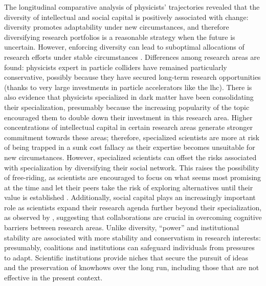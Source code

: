 \documentclass{article}
\begin{document}
The longitudinal comparative analysis of physicists' trajectories revealed that the diversity of intellectual and social capital is positively associated with change: diversity promotes adaptability under new circumstances, and therefore diversifying research portfolios is a reasonable strategy when the future is uncertain. However, enforcing diversity can lead to suboptimal allocations of research efforts under stable circumstances \citep{Schimmelpfennig2021}. Differences among research areas are found: physicists expert in particle colliders have remained particularly conservative, possibly because they have secured long-term research opportunities (thanks to very large investments in particle accelerators like the \gls{lhc}). There is also evidence that physicists specialized in dark matter have been consolidating their specialization, presumably because the increasing popularity of the topic encouraged them to double down their investment in this research area. Higher concentrations of intellectual capital in certain research areas generate stronger commitment towards these areas; therefore, specialized scientists are more at risk of being trapped in a sunk cost fallacy as their expertise becomes unsuitable for new circumstances. However, specialized scientists can offset the risks associated with specialization by diversifying their social network. This raises the possibility of free-riding, as scientists are encouraged to focus on what seems most promising at the time and let their peers take the risk of exploring alternatives until their value is established \citep{Kummerfeld2016}. Additionally, social capital plays an increasingly important role as scientists expand their research agenda further beyond their specialization, as observed by \citealt{Tripodi2020}, suggesting that collaborations are crucial in overcoming cognitive barriers between research areas. Unlike diversity, ``power'' and institutional stability are associated with more stability and conservatism in research interests: presumably, coalitions and institutions can safeguard individuals from pressures to adapt. Scientific institutions provide niches that secure the pursuit of ideas and the preservation of knowhows over the long run, including those that are not effective in the present context. %

\end{document}
